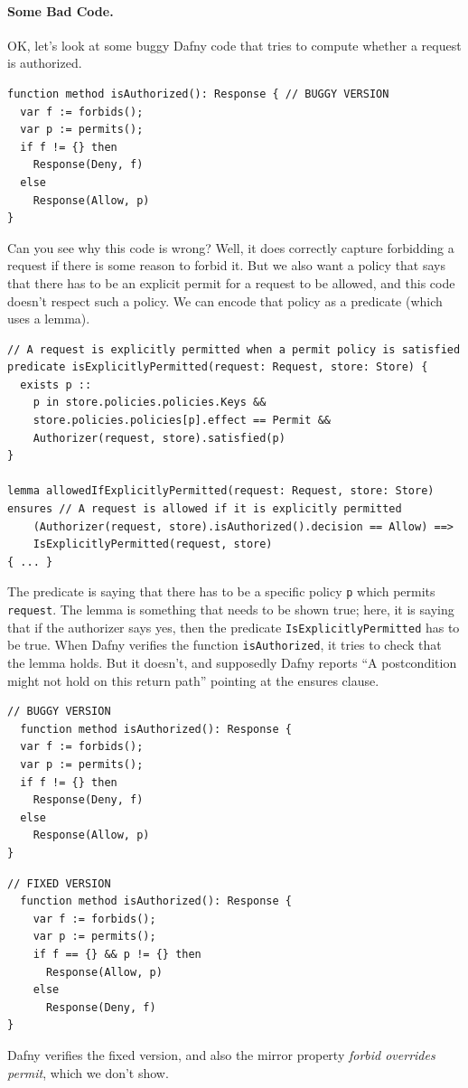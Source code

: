 \documentclass[11pt]{article}
\begin{document}
\paragraph{Some Bad Code.} OK, let's look at some buggy Dafny code that tries to compute whether a request is authorized.
\begin{lstlisting}[language=dafny]
function method isAuthorized(): Response { // BUGGY VERSION
  var f := forbids();
  var p := permits();
  if f != {} then
    Response(Deny, f)
  else
    Response(Allow, p)
}
\end{lstlisting}
Can you see why this code is wrong? Well, it does correctly capture forbidding a request if there is some reason to forbid it. But we also want a policy that says that there has to be an explicit permit for a request to be allowed, and this code doesn't respect such a policy. We can encode that policy as a predicate (which uses a lemma).
\begin{lstlisting}[language=dafny]
// A request is explicitly permitted when a permit policy is satisfied
predicate isExplicitlyPermitted(request: Request, store: Store) {
  exists p ::
    p in store.policies.policies.Keys &&
    store.policies.policies[p].effect == Permit &&
    Authorizer(request, store).satisfied(p)
}

lemma allowedIfExplicitlyPermitted(request: Request, store: Store)
ensures // A request is allowed if it is explicitly permitted
	(Authorizer(request, store).isAuthorized().decision == Allow) ==>
	IsExplicitlyPermitted(request, store)
{ ... }
\end{lstlisting}
The predicate is saying that there has to be a specific policy \texttt{p} which permits \texttt{request}.
The lemma is something that needs to be shown true; here, it is saying that if the authorizer says yes,
then the predicate \texttt{IsExplicitlyPermitted} has to be true. When Dafny verifies the
function \texttt{isAuthorized}, it tries to check that the lemma holds. But it doesn't, and
supposedly Dafny reports ``A postcondition might not hold on this return path'' pointing at the
ensures clause.
\begin{center}
\begin{minipage}{.45\textwidth}
\begin{lstlisting}[language=dafny]
  // BUGGY VERSION
  function method isAuthorized(): Response { 
  var f := forbids();
  var p := permits();
  if f != {} then
    Response(Deny, f)
  else
    Response(Allow, p)
}
\end{lstlisting} \end{minipage} \begin{minipage}{.45\textwidth}
  \begin{lstlisting}[language=dafny]
  // FIXED VERSION
  function method isAuthorized(): Response {
    var f := forbids();
    var p := permits();
    if f == {} && p != {} then
      Response(Allow, p)
    else
      Response(Deny, f)
}
  \end{lstlisting}
\end{minipage}
\end{center}
Dafny verifies the fixed version, and also the mirror property \emph{forbid overrides permit}, which we don't show.
\end{document}
